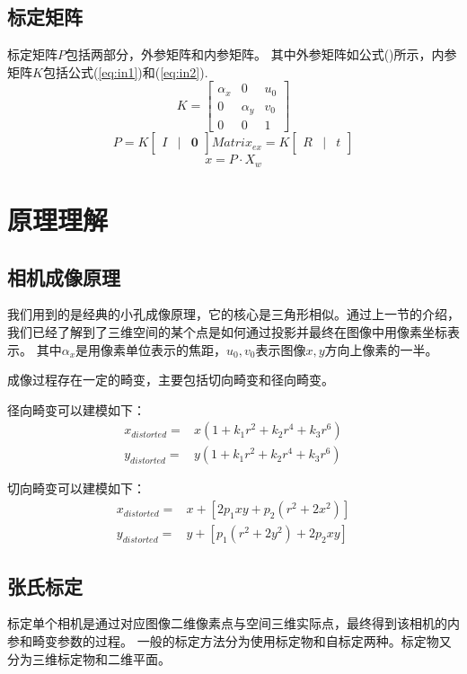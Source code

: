 \documentclass[10pt,a4paper]{article}
\begin{document}
\begin{CJK*}{UTF8}{gbsn}
\subsection{标定矩阵}
标定矩阵$P$包括两部分，外参矩阵和内参矩阵。
其中外参矩阵如公式(\pageref{ex})所示，内参矩阵$K$包括公式(\ref{eq:in1})和(\ref{eq:in2}).
\begin{equation}
\label{ww}
K = \begin{bmatrix}
\alpha_x & 0 & u_0 \\
0 & \alpha_y & v_0 \\
0 & 0 & 1
\end{bmatrix}
\end{equation}
\begin{equation}
P = K \begin{bmatrix}  I & | & \mathbf{0}\end{bmatrix} Matrix_{ex} = K \begin{bmatrix}  R&|&t\end{bmatrix}
\end{equation}
\begin{equation}
x = P \cdot X_w
\end{equation}

\section{原理理解}
\subsection{相机成像原理}
我们用到的是经典的小孔成像原理，它的核心是三角形相似。通过上一节的介绍，我们已经了解到了三维空间的某个点是如何通过投影并最终在图像中用像素坐标表示。
其中$\alpha_x$是用像素单位表示的焦距，$u_0, v_0$表示图像$x, y$方向上像素的一半。

成像过程存在一定的畸变，主要包括切向畸变和径向畸变。

径向畸变可以建模如下：
\begin{align}
    x_{distorted} =& x( 1 + k_1 r^2 + k_2 r^4 + k_3 r^6) \\ 
    y_{distorted} =& y( 1 + k_1 r^2 + k_2 r^4 + k_3 r^6)
\end{align}

切向畸变可以建模如下：
\begin{align}
    x_{distorted} =& x + [ 2p_1xy + p_2(r^2+2x^2)] \\ 
    y_{distorted} =& y + [ p_1(r^2+ 2y^2)+ 2p_2xy]
\end{align}
\subsection{张氏标定}
标定单个相机是通过对应图像二维像素点与空间三维实际点，最终得到该相机的内参和畸变参数的过程。
一般的标定方法分为使用标定物和自标定两种。标定物又分为三维标定物和二维平面。


\end{CJK*}
\end{document}
